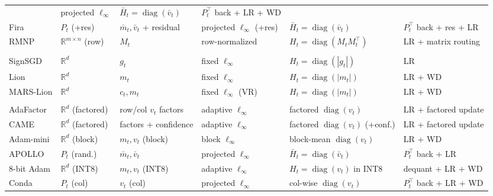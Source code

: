 \begin{table}[htbp]
\begin{tabularx}{\textwidth}{
  @{}
  p{}
  p{}
  Y 
  Y 
  Y 
  Y
  @{}}
      & projected $\ell_\infty$ & $\bar{H}_t=\operatorname{diag}(\bar{v}_t)$
      & $P_t^\top$ back + LR + WD \\
    Fira
      & $P_t$ (+res) & $\bar{m}_t,\bar{v}_t$ + residual
      & projected $\ell_\infty$ (+res)
      & $\bar{H}_t=\operatorname{diag}(\bar{v}_t)$ & $P_t^\top$ back + res + LR \\
    RMNP
      & $\mathbb{R}^{m\times n}$ (row) & $M_t$
      & row-normalized & $H_t=\operatorname{diag}(M_t M_t^\top)$
      & LR + matrix routing \\
    \midrule
     \\
    SignSGD
      & $\mathbb{R}^d$ & $g_t$
      & fixed $\ell_\infty$ & $H_t=\operatorname{diag}(|g_t|)$ & LR \\
    Lion
      & $\mathbb{R}^d$ & $m_t$
      & fixed $\ell_\infty$ & $H_t=\operatorname{diag}(|m_t|)$ & LR + WD \\
    MARS-Lion
      & $\mathbb{R}^d$ & $c_t,m_t$
      & fixed $\ell_\infty$ (VR) & $H_t=\operatorname{diag}(|m_t|)$
      & LR + WD \\
    \midrule
     \\
    AdaFactor
      & $\mathbb{R}^d$ (factored) & row/col $v_t$ factors
      & adaptive $\ell_\infty$ & factored $\operatorname{diag}(v_t)$
      & LR + factored update \\
    CAME
      & $\mathbb{R}^d$ (factored) & factors + confidence
      & adaptive $\ell_\infty$ & factored $\operatorname{diag}(v_t)$ (+conf.)
      & LR + factored update \\
    Adam-mini
      & $\mathbb{R}^d$ (block) & $m_t,v_t$ (block)
      & block $\ell_\infty$ & block-mean $\operatorname{diag}(v_t)$ & LR + WD \\
    APOLLO
      & $P_t$ (rand.) & $\bar{m}_t,\bar{v}_t$
      & projected $\ell_\infty$ & $\bar{H}_t=\operatorname{diag}(\bar{v}_t)$
      & $P_t^\top$ back + LR \\
    8-bit Adam
      & $\mathbb{R}^d$ (INT8) & $m_t,v_t$ (INT8)
      & adaptive $\ell_\infty$
      & $H_t=\operatorname{diag}(v_t)$ in INT8
      & dequant + LR + WD \\
    Conda
      & $P_t$ (col) & $v_t$ (col)
      & projected $\ell_\infty$ & col-wise $\operatorname{diag}(v_t)$
      & $P_t^\top$ back + LR + WD \\

\end{tabularx}
\end{table}
